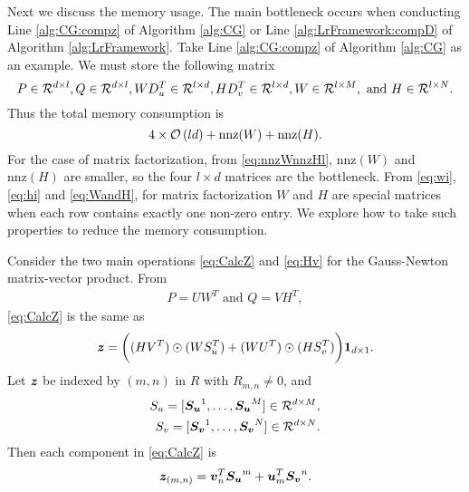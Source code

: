 Next we discuss the memory usage. The main bottleneck occurs when conducting Line \ref{alg:CG:compz} of Algorithm \ref{alg:CG} or Line \ref{alg:LrFramework:compD} of Algorithm \ref{alg:LrFramework}. Take Line \ref{alg:CG:compz} of Algorithm \ref{alg:CG} as an example. We must store the following matrix 
\begin{equation}
P \in \mathcal R^{d \times l}, Q \in \mathcal R^{d \times l}, WD_{u}^T \in \mathcal R^{l \times d}, HD_{v}^T \in \mathcal R^{l \times d}, W \in \mathcal R^{l \times M},\text{ and }H \in \mathcal R^{l \times N}. 
\label{eq:severalmatrices}
\end{equation}
Thus the total memory consumption is
\begin{equation*}
4 \times \mathcal{O}\left(ld\right)+ \text{nnz}(W) + \text{nnz}(H).
\end{equation*}
For the case of matrix factorization, from \eqref{eq:nnzWnnzHl}, $\text{nnz}(W)$ and $\text{nnz}(H)$ are smaller, so the four $l \times d$ matrices are the bottleneck.
From \eqref{eq:wi}, \eqref{eq:hi} and \eqref{eq:WandH}, for matrix factorization $W$ and $H$ are special matrices when each row contains exactly one non-zero entry. We explore how to take such properties to reduce the memory consumption.
\par Consider the two main operations \eqref{eq:CalcZ} and \eqref{eq:Hv} for the Gauss-Newton matrix-vector product. From
\begin{align*}
P = UW^T \text{ and } Q = VH^T,
\end{align*}
\eqref{eq:CalcZ} is the same as 
\begin{align*}
\textbf{\textit{z}} = \biggl({(HV^T)}\odot{(WS_u^T)}+{(WU^T)}\odot{(HS_v^T)}\biggr) \boldsymbol{1}_{d\times 1}.
\end{align*}
Let $\textbf{\textit{z}}$ be indexed by $(m, n)$ in $R$ with $R_{m,n} \neq 0$, and
\begin{align*}
S_u=[\boldsymbol{S_u}^1,\dots,\boldsymbol{S_u}^M] \in \mathcal R^{d\times M},\\
S_v=[\boldsymbol{S_v}^1,\dots,\boldsymbol{S_v}^N] \in \mathcal R^{d\times N}.
\end{align*}
Then each component in \eqref{eq:CalcZ} is
\begin{equation*}
\textbf{\textit{z}}_{(m,n)} = \boldsymbol{v}_n^T \boldsymbol{S_u}^m + \boldsymbol{u}_m^T \boldsymbol{S_v}^n.
\end{equation*}
